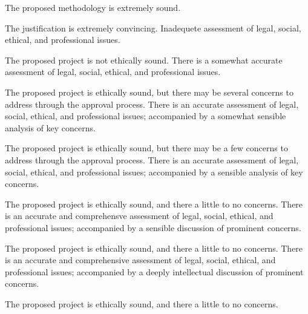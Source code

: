 \begin{markingrubric}
        \grade 		The proposed methodology is extremely sound.
        \par		The justification is extremely convincing.
%
        \grade\fail 	Inadequete assessment of legal, social, ethical, and professional issues.
         \par		The proposed project is not ethically sound.
        \grade 		There is a somewhat accurate assessment of legal, social, ethical, and professional issues.
        \par		The proposed project is ethically sound, but there may be several concerns to address through the approval process.
        \grade 		There is an accurate assessment of legal, social, ethical, and professional issues; accompanied by a somewhat sensible analysis of key concerns.
        \par		The proposed project is ethically sound, but there may be a few concerns to address through the approval process.
        \grade 		There is an accurate assessment of legal, social, ethical, and professional issues; accompanied by a sensible analysis of key concerns.
        \par		The proposed project is ethically sound, and there a little to no concerns.
        \grade 		There is an accurate and comprehensve assessment of legal, social, ethical, and professional issues; accompanied by a sensible discussion of prominent concerns.
        \par		The proposed project is ethically sound, and there a little to no concerns.
        \grade 		There is an accurate and comprehensive assessment of legal, social, ethical, and professional issues; accompanied by a deeply intellectual discussion of prominent concerns.
        \par		The proposed project is ethically sound, and there a little to no concerns.
%
\end{markingrubric}

